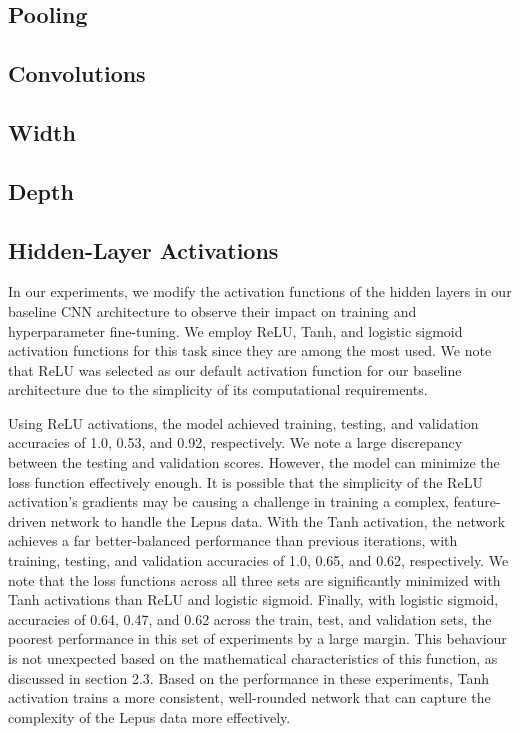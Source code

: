 \documentclass{article}
\begin{document}
\subsection{Pooling}
\subsection{Convolutions}
\subsection{Width}
\subsection{Depth}
\subsection{Hidden-Layer Activations}
In our experiments, we modify the activation functions of the hidden layers in our baseline CNN architecture to observe their impact on training and hyperparameter fine-tuning. We employ ReLU, Tanh, and logistic sigmoid activation functions for this task since they are among the most used. We note that ReLU was selected as our default activation function for our baseline architecture due to the simplicity of its computational requirements.

Using ReLU activations, the model achieved training, testing, and validation accuracies of 1.0, 0.53, and 0.92, respectively. We note a large discrepancy between the testing and validation scores. However, the model can minimize the loss function effectively enough. It is possible that the simplicity of the ReLU activation’s gradients may be causing a challenge in training a complex, feature-driven network to handle the Lepus data. With the Tanh activation, the network achieves a far better-balanced performance than previous iterations, with training, testing, and validation accuracies of 1.0, 0.65, and 0.62, respectively. We note that the loss functions across all three sets are significantly minimized with Tanh activations than ReLU and logistic sigmoid. Finally, with logistic sigmoid, accuracies of 0.64, 0.47, and 0.62 across the train, test, and validation sets, the poorest performance in this set of experiments by a large margin. This behaviour is not unexpected based on the mathematical characteristics of this function, as discussed in section 2.3. Based on the performance in these experiments, Tanh activation trains a more consistent, well-rounded network that can capture the complexity of the Lepus data more effectively.
\end{document}
